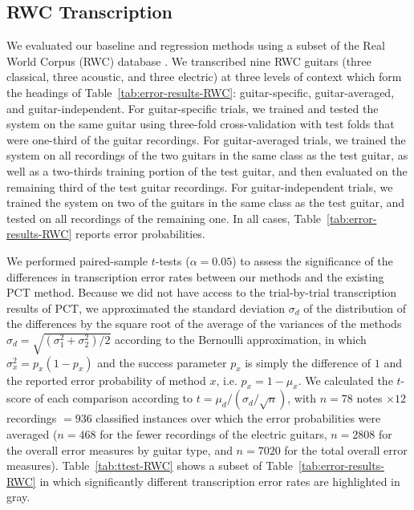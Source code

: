 \documentclass[convention,peer-reviewed]{aesconf}
\begin{document}
\subsection{RWC Transcription}
We evaluated our baseline and regression methods using a subset of the Real World Corpus (RWC) database \citep{goto2003}. We transcribed nine RWC guitars (three classical, three acoustic, and three electric) at three levels of context which form the headings of Table~\ref{tab:error-results-RWC}: guitar-specific, guitar-averaged, and guitar-independent. For guitar-specific trials, we trained and tested the system on the same guitar using three-fold cross-validation with test folds that were one-third of the guitar recordings. For guitar-averaged trials, we trained the system on all recordings of the two guitars in the same class as the test guitar, as well as a two-thirds training portion of the test guitar, and then evaluated on the remaining third of the test guitar recordings. For guitar-independent trials, we trained the system on two of the guitars in the same class as the test guitar, and tested on all recordings of the remaining one. In all cases, Table~\ref{tab:error-results-RWC} reports error probabilities.

We performed paired-sample $t$-tests ($\alpha = 0.05$) to assess the significance of the differences in transcription error rates between our methods and the existing PCT method. Because we did not have access to the trial-by-trial transcription results of PCT, we approximated the standard deviation $\sigma_d$ of the distribution of the differences by the square root of the average of the variances of the methods $\sigma_d = \sqrt{(\sigma^2_1+\sigma^2_2)/2}$ according to the Bernoulli approximation, in which $\sigma_x^2 = p_x(1-p_x)$ and the success parameter $p_x$ is simply the difference of $1$ and the reported error probability of method $x$, i.e. $p_x = 1-\mu_x$. We calculated the $t$-score of each comparison according to $t = \mu_d/(\sigma_d/\sqrt{n})$, with $n= 78$ notes $\times 12$ recordings $=936$ classified instances over which the error probabilities were averaged ($n=468$ for the fewer recordings of the electric guitars, $n=2808$ for the overall error measures by guitar type, and $n=7020$ for the total overall error measures). Table~\ref{tab:ttest-RWC} shows a subset of Table~\ref{tab:error-results-RWC} in which significantly different transcription error rates are highlighted in gray.
\end{document}

